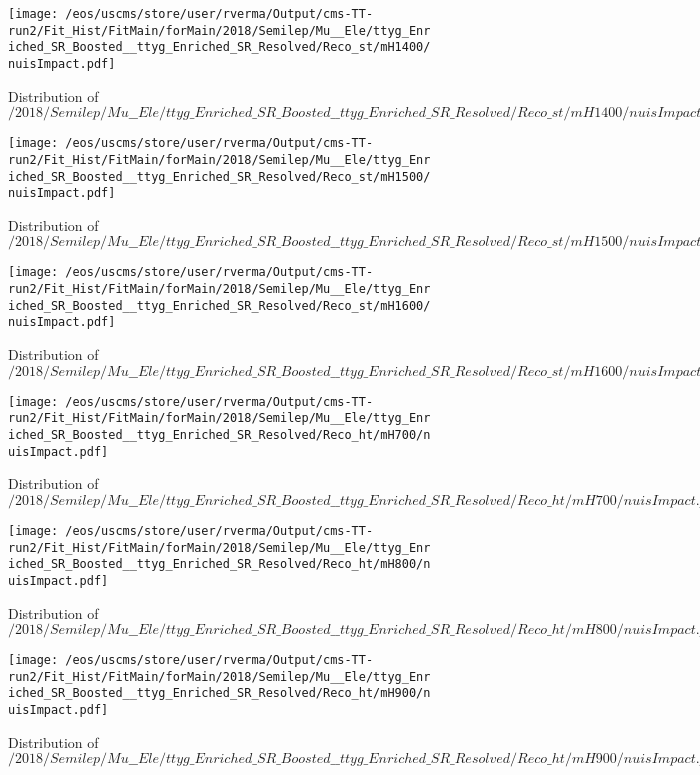 \begin{figure}
\centering
\texttt{[image: /eos/uscms/store/user/rverma/Output/cms-TT-run2/Fit\_Hist/FitMain/forMain/2018/Semilep/Mu\_\_Ele/ttyg\_Enriched\_SR\_Boosted\_\_ttyg\_Enriched\_SR\_Resolved/Reco\_st/mH1400/nuisImpact.pdf]}
\caption{Distribution of $/2018/Semilep/Mu\_\_Ele/ttyg\_Enriched\_SR\_Boosted\_\_ttyg\_Enriched\_SR\_Resolved/Reco\_st/mH1400/nuisImpact.pdf$}
\end{figure}

\begin{figure}
\centering
\texttt{[image: /eos/uscms/store/user/rverma/Output/cms-TT-run2/Fit\_Hist/FitMain/forMain/2018/Semilep/Mu\_\_Ele/ttyg\_Enriched\_SR\_Boosted\_\_ttyg\_Enriched\_SR\_Resolved/Reco\_st/mH1500/nuisImpact.pdf]}
\caption{Distribution of $/2018/Semilep/Mu\_\_Ele/ttyg\_Enriched\_SR\_Boosted\_\_ttyg\_Enriched\_SR\_Resolved/Reco\_st/mH1500/nuisImpact.pdf$}
\end{figure}

\begin{figure}
\centering
\texttt{[image: /eos/uscms/store/user/rverma/Output/cms-TT-run2/Fit\_Hist/FitMain/forMain/2018/Semilep/Mu\_\_Ele/ttyg\_Enriched\_SR\_Boosted\_\_ttyg\_Enriched\_SR\_Resolved/Reco\_st/mH1600/nuisImpact.pdf]}
\caption{Distribution of $/2018/Semilep/Mu\_\_Ele/ttyg\_Enriched\_SR\_Boosted\_\_ttyg\_Enriched\_SR\_Resolved/Reco\_st/mH1600/nuisImpact.pdf$}
\end{figure}

\begin{figure}
\centering
\texttt{[image: /eos/uscms/store/user/rverma/Output/cms-TT-run2/Fit\_Hist/FitMain/forMain/2018/Semilep/Mu\_\_Ele/ttyg\_Enriched\_SR\_Boosted\_\_ttyg\_Enriched\_SR\_Resolved/Reco\_ht/mH700/nuisImpact.pdf]}
\caption{Distribution of $/2018/Semilep/Mu\_\_Ele/ttyg\_Enriched\_SR\_Boosted\_\_ttyg\_Enriched\_SR\_Resolved/Reco\_ht/mH700/nuisImpact.pdf$}
\end{figure}

\begin{figure}
\centering
\texttt{[image: /eos/uscms/store/user/rverma/Output/cms-TT-run2/Fit\_Hist/FitMain/forMain/2018/Semilep/Mu\_\_Ele/ttyg\_Enriched\_SR\_Boosted\_\_ttyg\_Enriched\_SR\_Resolved/Reco\_ht/mH800/nuisImpact.pdf]}
\caption{Distribution of $/2018/Semilep/Mu\_\_Ele/ttyg\_Enriched\_SR\_Boosted\_\_ttyg\_Enriched\_SR\_Resolved/Reco\_ht/mH800/nuisImpact.pdf$}
\end{figure}

\begin{figure}
\centering
\texttt{[image: /eos/uscms/store/user/rverma/Output/cms-TT-run2/Fit\_Hist/FitMain/forMain/2018/Semilep/Mu\_\_Ele/ttyg\_Enriched\_SR\_Boosted\_\_ttyg\_Enriched\_SR\_Resolved/Reco\_ht/mH900/nuisImpact.pdf]}
\caption{Distribution of $/2018/Semilep/Mu\_\_Ele/ttyg\_Enriched\_SR\_Boosted\_\_ttyg\_Enriched\_SR\_Resolved/Reco\_ht/mH900/nuisImpact.pdf$}
\end{figure}

